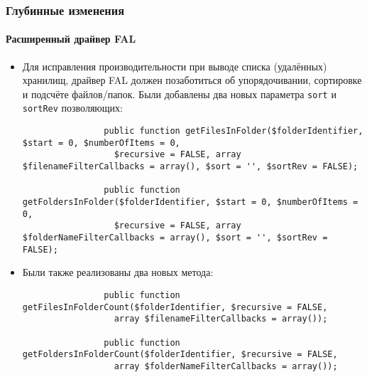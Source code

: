 \begin{frame}[fragile]
	\frametitle{Глубинные изменения}
	\framesubtitle{Расширенный драйвер FAL}

	\lstset{basicstyle=\tiny\ttfamily}

	\begin{itemize}
		\item Для исправления производительности при выводе списка (удалённых) хранилищ, драйвер
		FAL должен позаботиться об упорядочивании, сортировке и подсчёте файлов/папок. Были
		добавлены два новых параметра \texttt{sort} и \texttt{sortRev} позволяющих:

			\begin{lstlisting}
				public function getFilesInFolder($folderIdentifier, $start = 0, $numberOfItems = 0,
				  $recursive = FALSE, array $filenameFilterCallbacks = array(), $sort = '', $sortRev = FALSE);

				public function getFoldersInFolder($folderIdentifier, $start = 0, $numberOfItems = 0,
				  $recursive = FALSE, array $folderNameFilterCallbacks = array(), $sort = '', $sortRev = FALSE);
			\end{lstlisting}

		\item Были также реализованы два новых метода:

			\begin{lstlisting}
				public function getFilesInFolderCount($folderIdentifier, $recursive = FALSE,
				  array $filenameFilterCallbacks = array());

				public function getFoldersInFolderCount($folderIdentifier, $recursive = FALSE,
				  array $folderNameFilterCallbacks = array());
			\end{lstlisting}

	\end{itemize}

\end{frame}

